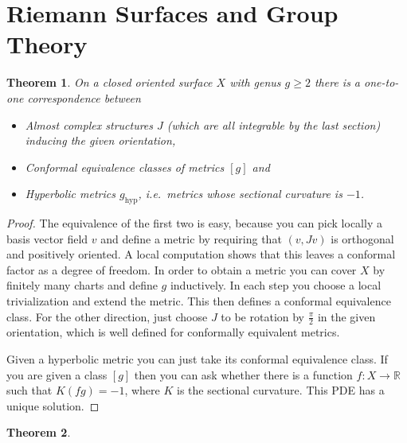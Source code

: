 \documentclass[a4paper]{article}
\newcommand{\RR}{\mathbb{R}}
\newcommand{\lra}{\longrightarrow}
\newtheorem*{thm}{Theorem}
\theoremstyle{definition}
\theoremstyle{remark}
\theoremstyle{remark}
\begin{document}
\section*{Riemann Surfaces and Group Theory}

\begin{thm}
On a closed oriented surface $X$ with genus $g\geq 2$ there is a one-to-one correspondence between 
\begin{itemize}
\item Almost complex structures $J$ (which are all integrable by the last section) inducing the given orientation,
\item Conformal equivalence classes of metrics $[g]$ and
\item Hyperbolic metrics $g_{\text{hyp}}$, i.e.\ metrics whose sectional curvature is $-1$.
\end{itemize}
\end{thm}

\begin{proof}
  The equivalence of the first two is easy, because you can pick locally a basis vector field $v$ and define a metric by requiring that $(v,Jv)$ is orthogonal and positively oriented. A local computation shows that this leaves a conformal factor as a degree of freedom.  In order to obtain a metric you can cover $X$ by finitely many charts and define $g$ inductively. In each step you choose a local trivialization and extend the metric. This then defines a conformal equivalence class. For the other direction, just choose $J$ to be rotation by $\frac{\pi}{2}$ in the given orientation, which is well defined for conformally equivalent metrics.

Given a hyperbolic metric you can just take its conformal equivalence class. If you are given a class $[g]$ then you can ask whether there is a function $f:X\lra\RR$ such that $K(fg)=-1$, where $K$ is the sectional curvature. This PDE has a unique solution.
\end{proof}

\begin{thm}
\end{thm}
\end{document}
